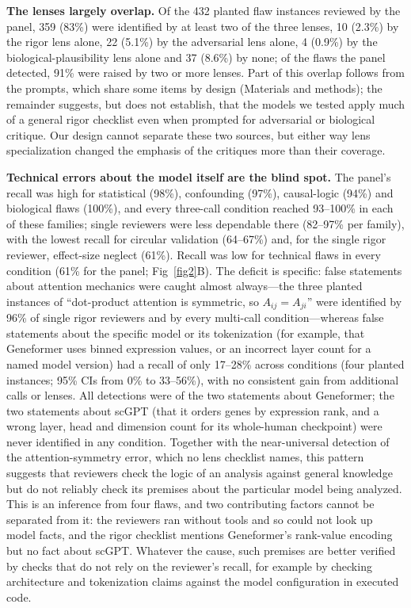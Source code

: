 \documentclass[10pt,letterpaper]{article}
\begin{document}
\textbf{The lenses largely overlap.} Of the 432 planted flaw instances reviewed by the panel, 359 (83\%) were identified by at least two of the three lenses, 10 (2.3\%) by the rigor lens alone, 22 (5.1\%) by the adversarial lens alone, 4 (0.9\%) by the biological-plausibility lens alone and 37 (8.6\%) by none; of the flaws the panel detected, 91\% were raised by two or more lenses. Part of this overlap follows from the prompts, which share some items by design (Materials and methods); the remainder suggests, but does not establish, that the models we tested apply much of a general rigor checklist even when prompted for adversarial or biological critique. Our design cannot separate these two sources, but either way lens specialization changed the emphasis of the critiques more than their coverage.

\textbf{Technical errors about the model itself are the blind spot.} The panel's recall was high for statistical (98\%), confounding (97\%), causal-logic (94\%) and biological flaws (100\%), and every three-call condition reached 93--100\% in each of these families; single reviewers were less dependable there (82--97\% per family), with the lowest recall for circular validation (64--67\%) and, for the single rigor reviewer, effect-size neglect (61\%). Recall was low for technical flaws in every condition (61\% for the panel; Fig~\ref{fig2}B). The deficit is specific: false statements about attention mechanics were caught almost always---the three planted instances of ``dot-product attention is symmetric, so $A_{ij}=A_{ji}$'' were identified by 96\% of single rigor reviewers and by every multi-call condition---whereas false statements about the specific model or its tokenization (for example, that Geneformer uses binned expression values, or an incorrect layer count for a named model version) had a recall of only 17--28\% across conditions (four planted instances; 95\% CIs from 0\% to 33--56\%), with no consistent gain from additional calls or lenses. All detections were of the two statements about Geneformer; the two statements about scGPT (that it orders genes by expression rank, and a wrong layer, head and dimension count for its whole-human checkpoint) were never identified in any condition. Together with the near-universal detection of the attention-symmetry error, which no lens checklist names, this pattern suggests that reviewers check the logic of an analysis against general knowledge but do not reliably check its premises about the particular model being analyzed. This is an inference from four flaws, and two contributing factors cannot be separated from it: the reviewers ran without tools and so could not look up model facts, and the rigor checklist mentions Geneformer's rank-value encoding but no fact about scGPT. Whatever the cause, such premises are better verified by checks that do not rely on the reviewer's recall, for example by checking architecture and tokenization claims against the model configuration in executed code.
\end{document}
